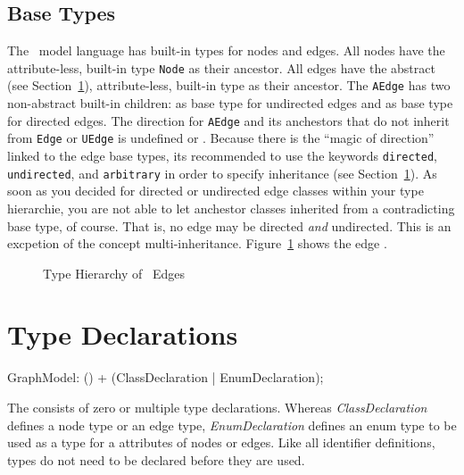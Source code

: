 \subsection{Base Types}
\label{sct:basetypes}
The \GrG\ model language has built-in types for nodes and edges.
All nodes have the attribute-less, built-in type \texttt{Node} as their ancestor.
All edges have the abstract (see Section~\ref{typedecl}), attribute-less, built-in type \texttt{} as their ancestor.
The \texttt{AEdge} has two non-abstract built-in children: \texttt{} as base type for undirected edges and \texttt{} as base type for directed edges.
The direction for \texttt{AEdge} and its anchestors that do not inherit from \texttt{Edge} or \texttt{UEdge} is undefined or .
Because there is the ``magic of direction'' linked to the edge base types, its recommended to use the keywords \texttt{directed}, \texttt{undirected}, and \texttt{arbitrary} in order to specify inheritance (see Section~\ref{typedecl}).
As soon as you decided for directed or undirected edge classes within your type hierarchie, you are not able to let anchestor classes inherited from a contradicting base type, of course.
That is, no edge may be directed \emph{and} undirected.
This is an excpetion of the concept multi-inheritance.
Figure~\ref{fig:basetypes} shows the edge .
\begin{figure}[htbp]
	\centering
	
	\caption{Type Hierarchy of \GrG\ Edges}
	\label{fig:basetypes}
\end{figure}

\section{Type Declarations}
\label{typedecl}

\begin{rail}
  GraphModel: () + (ClassDeclaration | EnumDeclaration);
\end{rail}
The  consists of zero or multiple type declarations. Whereas \emph{ClassDeclaration} defines a node type or an edge type, \emph{EnumDeclaration} defines an enum type to be used as a type for a attributes of nodes or edges. Like all identifier definitions, types do not need to be declared before they are used.

